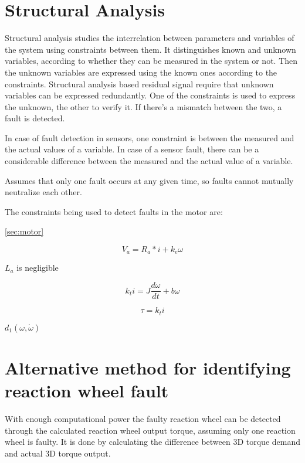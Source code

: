 \section{Structural Analysis}

\label{sec:structural}

Structural analysis studies the interrelation between parameters and variables of the system using constraints between them. It distinguishes known and unknown variables, according to whether they can be measured in the system or not. Then the unknown variables are expressed using the known ones according to the constraints. Structural analysis based residual signal require that unknown variables can be expressed redundantly. One of the constraints is used to express the unknown, the other to verify it. If there's a mismatch between the two, a fault is detected.

In case of fault detection in sensors, one constraint is between the measured and the actual values of a variable. In case of a sensor fault, there can be a considerable difference between the measured and the actual value of a variable.

Assumes that only one fault occurs at any given time, so faults cannot mutually neutralize each other. 

The constraints being used to detect faults in the motor are:

\ref{sec:motor} 


\begin{equation}
V_a = R_a * i + k_e \omega
\end{equation}

$L_a$ is negligible

\begin{equation}
 k_{t}i  =J\dfrac{d\omega}{dt} + b\omega
\end{equation}

\begin{equation}
\tau = k_t i
\end{equation}

$d_1(\omega, \dot{\omega})$


\section{Alternative method for identifying reaction wheel fault}

With enough computational power the faulty reaction wheel can be detected through the calculated reaction wheel output torque, assuming only one reaction wheel is faulty. It is done by calculating the difference between 3D torque demand and actual 3D torque output. 

